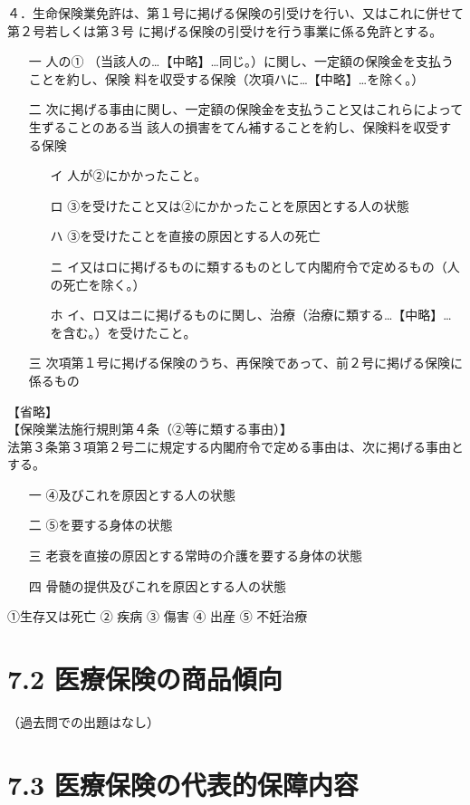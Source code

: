 \documentclass[report,gutter=10mm,fore-edge=10mm,uplatex,dvipdfmx]{jlreq}
\begin{document}
４．生命保険業免許は、第１号に掲げる保険の引受けを行い、又はこれに併せて第２号若しくは第３号
に掲げる保険の引受けを行う事業に係る免許とする。
\begin{itemize}
 \item [一]
人の①
（当該人の…【中略】…同じ。）に関し、一定額の保険金を支払うことを約し、保険
料を収受する保険（次項ハに…【中略】…を除く。）
 \item [二]
次に掲げる事由に関し、一定額の保険金を支払うこと又はこれらによって生ずることのある当
該人の損害をてん補することを約し、保険料を収受する保険
\begin{itemize}
 \item [イ]
 人が②にかかったこと。
 \item [ロ]
③を受けたこと又は②にかかったことを原因とする人の状態
 \item [ハ]
③を受けたことを直接の原因とする人の死亡
 \item [ニ]
 イ又はロに掲げるものに類するものとして内閣府令で定めるもの（人の死亡を除く。）
 \item [ホ]
 イ、ロ又はニに掲げるものに関し、治療（治療に類する…【中略】…を含む。）を受けたこと。
\end{itemize}
 \item [三] 次項第１号に掲げる保険のうち、再保険であって、前２号に掲げる保険に係るもの
\end{itemize}
【省略】\\
【保険業法施行規則第４条（②等に類する事由）】\\

法第３条第３項第２号二に規定する内閣府令で定める事由は、次に掲げる事由とする。
\begin{itemize}
 \item [一]
④及びこれを原因とする人の状態
 \item [二]⑤を要する身体の状態
 \item [三]老衰を直接の原因とする常時の介護を要する身体の状態
 \item [四]骨髄の提供及びこれを原因とする人の状態
\end{itemize}

①生存又は死亡 ② 疾病 ③ 傷害 ④ 出産 ⑤ 不妊治療

\section{7.2 医療保険の商品傾向}
（過去問での出題はなし）
\section{7.3 医療保険の代表的保障内容}
\end{document}
